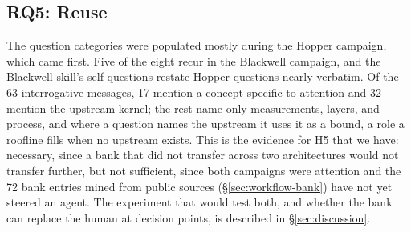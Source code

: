 \subsection{RQ5: Reuse}
\label{sec:eval-auto}

The question categories were populated mostly during the Hopper campaign, which came first. Five of
the eight recur in the Blackwell campaign, and the Blackwell skill's self-questions restate Hopper
questions nearly verbatim. Of the 63 interrogative messages, 17 mention a concept specific to
attention and 32 mention the upstream kernel; the rest name only measurements, layers, and process,
and where a question names the upstream it uses it as a bound, a role a roofline fills when no
upstream exists. This is the evidence for H5 that we have: necessary, since a bank that did not
transfer across two architectures would not transfer further, but not sufficient, since both
campaigns were attention and the 72 bank entries mined from public sources (\S\ref{sec:workflow-bank})
have not yet steered an agent. The experiment that would test both, and whether the bank can replace
the human at decision points, is described in \S\ref{sec:discussion}.
